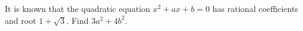 It is known that the quadratic equation $x^{2}+ax+b=0$ has rational coefficients and root $1+\sqrt{3}$. Find $3a^{2}+4b^{2}$.
